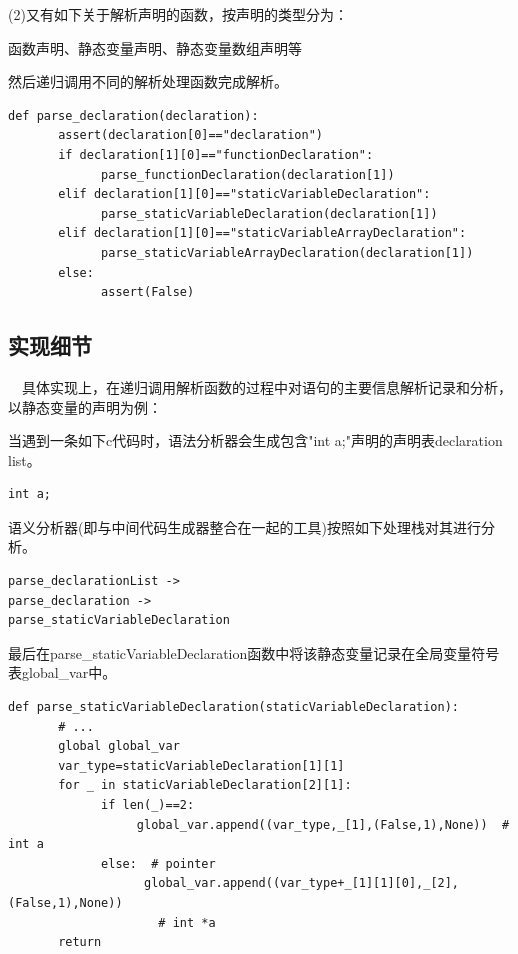 \documentclass{article}
\begin{document}
(2)又有如下关于解析声明的函数，按声明的类型分为：

函数声明、静态变量声明、静态变量数组声明等

然后递归调用不同的解析处理函数完成解析。

\begin{verbatim}
def parse_declaration(declaration):
       assert(declaration[0]=="declaration")
       if declaration[1][0]=="functionDeclaration":
             parse_functionDeclaration(declaration[1])
       elif declaration[1][0]=="staticVariableDeclaration":
             parse_staticVariableDeclaration(declaration[1])
       elif declaration[1][0]=="staticVariableArrayDeclaration":
             parse_staticVariableArrayDeclaration(declaration[1])
       else:
             assert(False)
\end{verbatim}

\subsection{实现细节}

\quad\ \ 具体实现上，在递归调用解析函数的过程中对语句的主要信息解析记录和分析，以静态变量的声明为例：

当遇到一条如下c代码时，语法分析器会生成包含"int a;"声明的声明表declaration list。

\begin{verbatim}
int a;
\end{verbatim}

语义分析器(即与中间代码生成器整合在一起的工具)按照如下处理栈对其进行分析。

\begin{verbatim}
parse_declarationList ->
parse_declaration ->
parse_staticVariableDeclaration
\end{verbatim}

最后在parse\_staticVariableDeclaration函数中将该静态变量记录在全局变量符号表global\_var中。

\begin{verbatim}
def parse_staticVariableDeclaration(staticVariableDeclaration):
       # ...
       global global_var
       var_type=staticVariableDeclaration[1][1]
       for _ in staticVariableDeclaration[2][1]:
             if len(_)==2:
                  global_var.append((var_type,_[1],(False,1),None))  # int a
             else:  # pointer
                   global_var.append((var_type+_[1][1][0],_[2],(False,1),None))
                     # int *a
       return
\end{verbatim}
\end{document}

